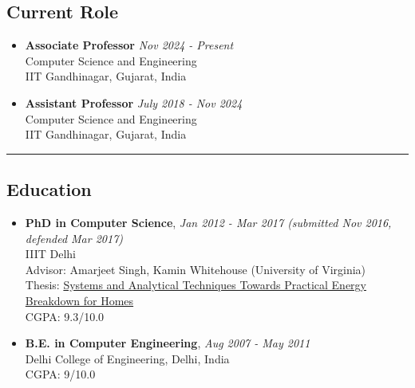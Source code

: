 \documentclass[letter,10pt]{article}
\begin{document}
\subsection*{\textbf{Current Role}}
\vspace{-0.4em}
\begin{itemize}
\item[] 
    \textbf{Associate Professor} \hfill \textit{Nov 2024 - Present}\\
    Computer Science and Engineering \\
	IIT Gandhinagar, Gujarat, India
\item[] 
    \textbf{Assistant Professor} \hfill \textit{July 2018 - Nov 2024}\\
    Computer Science and Engineering \\
	IIT Gandhinagar, Gujarat, India
\end{itemize}
\ifcvshort\else
\vspace{0.5em}
\noindent\rule{\textwidth}{0.5pt}
\vspace{-0.2em}
\fi

\subsection*{\textbf{Education}}
\vspace{-0.4em}
\begin{itemize}
\item[] 
    \textbf{PhD in Computer Science}, \hfill \textit{Jan 2012 - Mar 2017 (submitted Nov 2016, defended Mar 2017)}\\
	IIIT Delhi \\
	Advisor: Amarjeet Singh, Kamin Whitehouse (University of Virginia) \\
	Thesis: \href{https://nipunbatra.github.io/papers/batra_thesis.pdf}{Systems and Analytical Techniques Towards Practical Energy Breakdown for Homes}\\
	CGPA: 9.3/10.0
\item[]
	\textbf{B.E. in Computer Engineering}, \hfill \textit{Aug 2007 - May 2011}\\
	Delhi College of Engineering, Delhi, India \\
	CGPA: 9/10.0

\end{itemize}
\end{document}
